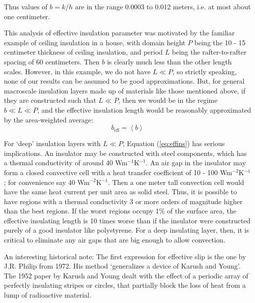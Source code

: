 \documentclass[12pt, a4paper, twoside, openright]{book}
\newcommand{\beff}{\ensuremath{b_{\mathrm{eff}}}}
\begin{document}
Thus values of $b = k/h$ are in the range 0.0003 to 0.012 meters, i.e. at most about one centimeter.

This analysis of effective insulation parameter was motivated by the familiar example of ceiling insulation in a house, with domain height $P$ being the 10 - 15 centimeter thickness of ceiling insulation, and period $L$ being the rafter-to-rafter spacing of 60 centimeters.  Then $b$ is clearly much less than the other length scales.  However, in this example, we do not have $L \ll P$, so strictly speaking, none of our results can be assumed to be good approximations.  But, for general macroscale insulation layers made up of materials like those mentioned above, if they are constructed such that $L \ll P$, then we would be in the regime $b \ll L \ll P$, and the effective insulation length would be reasonably approximated by the area-weighted average:
\begin{equation}
\beff = \left< b \right>
\label{eq:effins}
\end{equation}

For `deep' insulation layers with $L \ll P$, Equation (\ref{eq:effins}) has serious implications. An insulator may be constructed with steel components, which has a thermal conductivity of around 40 Wm$^{-1}$K$^{-1}$. An air gap in the insulator may form a closed convective cell with a heat transfer coefficient of 10 - 100 Wm$^{-2}$K$^{-1}$; for convenience say 40 Wm$^{-2}$K$^{-1}$.  Then a one meter tall convection cell would have the same heat current per unit area as solid steel.  Thus, it is possible to have regions with a thermal conductivity 3 or more orders of magnitude higher than the best regions. If the worst regions occupy 1\% of the surface area, the effective insulating length is 10 times worse than if the insulator were constructed purely of a good insulator like polystyrene.
For a deep insulating layer, then, it is critical to eliminate any air gaps that are big enough to allow convection.

\vspace{1em}
An interesting historical note: The first expression for effective slip is the one by J.R. Philip from 1972.  His method `generalizes a device of Karush and Young'.  The 1952 paper by Karush and Young
dealt with the effect of a periodic array of perfectly insulating stripes or circles, that partially block the loss of heat from a lump of radioactive material.
\end{document}
